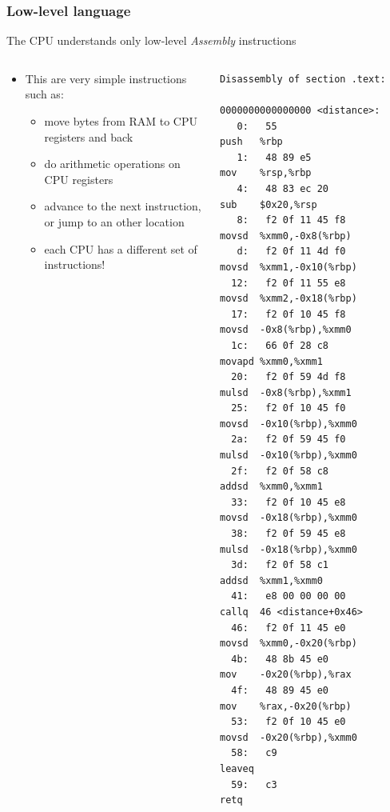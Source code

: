 \documentclass{beamer}
\begin{document}
\begin{frame}[fragile]
  \frametitle{Low-level language}
  \begin{block}{}
  The CPU understands only low-level \emph{Assembly} instructions
  \end{block}
  \begin{columns}
  \begin{column}[T]{0.4\textwidth}
  \begin{itemize}
  \item This are very simple instructions such as:
        \begin{itemize} 
        \item move bytes from RAM to CPU registers and back
        \item do arithmetic operations on CPU registers
        \item advance to the next instruction, or jump to an other
              location
        \item each CPU has a different set of instructions!
        \end{itemize}
  \end{itemize}
  \end{column}
  \begin{column}[T]{0.6\textwidth}
  \lstset{language=C++,basicstyle=\tiny\ttfamily}
  \begin{lstlisting}
Disassembly of section .text:

0000000000000000 <distance>:
   0:	55                   	push   %rbp
   1:	48 89 e5             	mov    %rsp,%rbp
   4:	48 83 ec 20          	sub    $0x20,%rsp
   8:	f2 0f 11 45 f8       	movsd  %xmm0,-0x8(%rbp)
   d:	f2 0f 11 4d f0       	movsd  %xmm1,-0x10(%rbp)
  12:	f2 0f 11 55 e8       	movsd  %xmm2,-0x18(%rbp)
  17:	f2 0f 10 45 f8       	movsd  -0x8(%rbp),%xmm0
  1c:	66 0f 28 c8          	movapd %xmm0,%xmm1
  20:	f2 0f 59 4d f8       	mulsd  -0x8(%rbp),%xmm1
  25:	f2 0f 10 45 f0       	movsd  -0x10(%rbp),%xmm0
  2a:	f2 0f 59 45 f0       	mulsd  -0x10(%rbp),%xmm0
  2f:	f2 0f 58 c8          	addsd  %xmm0,%xmm1
  33:	f2 0f 10 45 e8       	movsd  -0x18(%rbp),%xmm0
  38:	f2 0f 59 45 e8       	mulsd  -0x18(%rbp),%xmm0
  3d:	f2 0f 58 c1          	addsd  %xmm1,%xmm0
  41:	e8 00 00 00 00       	callq  46 <distance+0x46>
  46:	f2 0f 11 45 e0       	movsd  %xmm0,-0x20(%rbp)
  4b:	48 8b 45 e0          	mov    -0x20(%rbp),%rax
  4f:	48 89 45 e0          	mov    %rax,-0x20(%rbp)
  53:	f2 0f 10 45 e0       	movsd  -0x20(%rbp),%xmm0
  58:	c9                   	leaveq 
  59:	c3                   	retq   
  \end{lstlisting}
  \end{column}
  \end{columns}
\end{frame}
\end{document}
